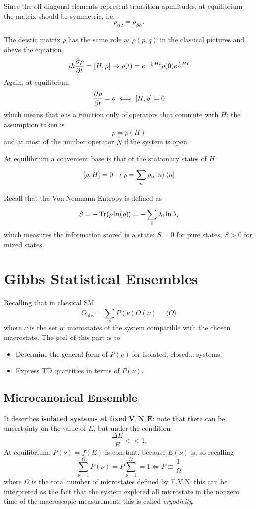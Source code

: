 
Since the off-diagonal elements represent transition apmlitudes, 
at equilibrium the matrix should be symmetric, i.e.
$$\rho_{\alpha\beta}=\rho_{\beta\alpha}.$$

The deistic matrix $\rho$ has the same role as $\rho(p,q)$ in the classical
pictures and obeys the equation
$$i\hbar\pdv[]{\rho}{t} = \left[H,\rho\right]\to \rho(t)=e^{-\frac{i}{\hbar}Ht}
\rho(0)e^{\frac{i}{\hbar}Ht}$$
Again, at equilibrium
$$\pdv[]{\rho}{t}=o\iff\left[H,\rho\right]=0$$
which means that $\rho$ is a function only of operators that commute with $H$:
the assumption taken is 
$$\rho = \rho(H)$$
and at most of the number operator $\hat N$ if the system is open.

At equilibrium a convenient base is that of the stationary states of $H$
$$[\rho,H]=0\to \rho = \sum_{n}^{}\rho_n\ket{n}\bra{n}$$

Recall that the Von Neumann Entropy is defined as
$$S=-\Tr(\rho\ln(\rho)) = -\sum_{i}^{}\lambda_i\ln\lambda_i$$
which measures the information stored in a state: $S=0$ for pure states,
$S>0$ for mixed states.
\section{Gibbs Statistical Ensembles}
Recalling that in classical SM
$$O_\text{obs}=\sum_{\nu}^{}P(\nu)O(\nu)=\langle O\rangle$$
where $\nu$ is the set of microstates of the system compatible with the
chosen macrostate. The goal of this part is to
\begin{itemize}
    \item Determine the general form of $P(\nu)$ for isolated, closed... systems.
    \item Express TD quantities in terms of $P(\nu)$.
\end{itemize}
\subsection{Microcanonical Ensemble}
It describes \textbf{isolated systems at fixed} $\mathbf{V,N,E}$: note that
there can be uncertainty on the value of $E$, but under the condition
$$\frac{\Delta E}{E}<<1.$$
At equilibrium, $P(\nu) = f(E)$ is constant, because $E(\nu)$ is, so recalling
$$\sum_{\nu=1}^{\Omega} P(\nu) = P\sum_{\nu=1}^{\Omega}=1 \iff
P\equiv\frac{1}{\Omega}$$
where $\Omega$ is the total number of microstates defined by E,V,N: this can be
interpreted as the fact that the system explored all microstate in the nonzero time
of the macroscopic measurement; this is called \textit{ergodicity}.

